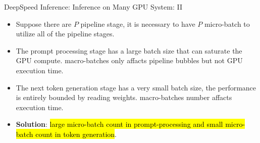 \begin{frame}{DeepSpeed Inference: Inference on Many GPU System: II}
    \begin{figure}
    \end{figure}
    \scriptsize{
    \begin{itemize}
        \item Suppose there are $P$ pipeline stage, it is necessary to have $P$ micro-batch to utilize all of the pipeline stages.
        \item The prompt processing stage has a large batch size that can saturate the GPU compute. macro-batches only affacts pipeline bubbles but not GPU execution time.
        \item The next token generation stage has a very small batch size, the performance is entirely bounded by reading weights. macro-batches number affacts execution time.
        \item \textbf{Solution}: \hl{large micro-batch count in prompt-processing and small micro-batch count in token generation}.
    \end{itemize}
    }
\end{frame}